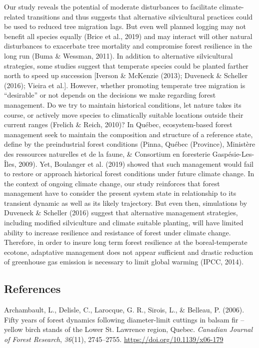 \documentclass[a4paperpaper,]{article}
\begin{document}
Our study reveals the potential of moderate disturbances to facilitate
climate-related transitions and thus suggests that alternative
silvicultural practices could be used to reduced tree migration lags.
But even well planned logging may not benefit all species equally (Brice
et al., 2019) and may interact will other natural disturbances to
exacerbate tree mortality and compromise forest resilience in the long
run (Buma \& Wessman, 2011). In addition to alternative silvicultural
strategies, some studies suggest that temperate species could be planted
farther north to speed up succession {[}Iverson \& McKenzie (2013);
Duveneck \& Scheller (2016); Vieira et al.{]}. However, whether
promoting temperate tree migration is ``desirable'' or not depends on
the decisions we make regarding forest management. Do we try to maintain
historical conditions, let nature takes its course, or actively move
species to climatically suitable locations outside their current ranges
(Frelich \& Reich, 2010)? In Québec, ecosystem-based forest management
seek to maintain the composition and structure of a reference state,
define by the preindustrial forest conditions (Pinna, Québec (Province),
Ministère des ressources naturelles et de la faune, \& Consortium en
foresterie Gaspésie-Les-Îles, 2009). Yet, Boulanger et al. (2019) showed
that such management would fail to restore or approach historical forest
conditions under future climate change. In the context of ongoing
climate change, our study reinforces that forest management have to
consider the present system state in relationship to its transient
dynamic as well as its likely trajectory. But even then, simulations by
Duveneck \& Scheller (2016) suggest that alternative management
strategies, including modified silviculture and climate suitable
planting, will have limited ability to increase resilience and
resistance of forest under climate change. Therefore, in order to insure
long term forest resilience at the boreal-temperate ecotone, adaptative
management does not appear sufficient and drastic reduction of
greenhouse gas emission is necessary to limit global warming (IPCC,
2014).

\hypertarget{references}{%
\subsection*{References}\label{references}}

\hypertarget{refs}{}
\leavevmode\hypertarget{ref-archambault_fifty_2006}{}%
Archambault, L., Delisle, C., Larocque, G. R., Sirois, L., \& Belleau,
P. (2006). Fifty years of forest dynamics following diameter-limit
cuttings in balsam fir -- yellow birch stands of the Lower St. Lawrence
region, Quebec. \emph{Canadian Journal of Forest Research},
\emph{36}(11), 2745--2755. \url{https://doi.org/10.1139/x06-179}
\end{document}

